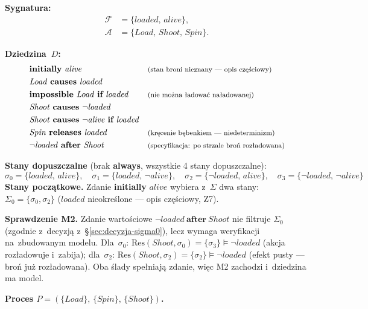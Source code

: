\documentclass[11pt,a4paper]{article}
\newcommand{\causes}{\textbf{causes}}
\newcommand{\aft}{\textbf{after}}
\renewcommand{\iff}{\textbf{if}}
\newcommand{\initially}{\textbf{initially}}
\newcommand{\always}{\textbf{always}}
\newcommand{\impossible}{\textbf{impossible}}
\newcommand{\releases}{\textbf{releases}}
\newcommand{\cmt}[1]{\text{\footnotesize\normalfont (#1)}}
\theoremstyle{definition}
\begin{document}
\medskip
\noindent\textbf{Sygnatura:}
\begin{align*}
  \mathcal{F} &= \{\mathit{loaded},\, \mathit{alive}\}, \\
  \mathcal{A} &= \{\mathit{Load},\, \mathit{Shoot},\, \mathit{Spin}\}.
\end{align*}

\medskip
\noindent\textbf{Dziedzina~$D$:}
{\small
\begin{align*}
  &\initially\ \mathit{alive}
    && \cmt{stan broni nieznany --- opis częściowy} \\
  &\mathit{Load}\ \causes\ \mathit{loaded} \\
  &\impossible\ \mathit{Load}\ \iff\ \mathit{loaded}
    && \cmt{nie można ładować naładowanej} \\
  &\mathit{Shoot}\ \causes\ \neg\mathit{loaded} \\
  &\mathit{Shoot}\ \causes\ \neg\mathit{alive}\ \iff\ \mathit{loaded} \\
  &\mathit{Spin}\ \releases\ \mathit{loaded}
    && \cmt{kręcenie bębenkiem --- niedeterminizm} \\
  &\neg\mathit{loaded}\ \aft\ \mathit{Shoot}
    && \cmt{specyfikacja: po strzale broń rozładowana}
\end{align*}
}

\noindent\textbf{Stany dopuszczalne}
(brak \always{}, wszystkie 4 stany dopuszczalne):
\[
  \sigma_0 = \{\mathit{loaded},\,\mathit{alive}\}, \quad
  \sigma_1 = \{\mathit{loaded},\,\neg\mathit{alive}\}, \quad
  \sigma_2 = \{\neg\mathit{loaded},\,\mathit{alive}\}, \quad
  \sigma_3 = \{\neg\mathit{loaded},\,\neg\mathit{alive}\}
\]
\noindent\textbf{Stany początkowe.} Zdanie \initially{} $\mathit{alive}$
wybiera z~$\Sigma$ dwa stany: $\Sigma_0 = \{\sigma_0, \sigma_2\}$
($\mathit{loaded}$ nieokreślone --- opis częściowy, Z7).

\smallskip
\noindent\textbf{Sprawdzenie M2.} Zdanie wartościowe
$\neg\mathit{loaded}\ \aft\ \mathit{Shoot}$ nie filtruje $\Sigma_0$
(zgodnie z~decyzją z~§\ref{sec:decyzja-sigma0}), lecz wymaga weryfikacji
na~zbudowanym modelu. Dla~$\sigma_0$: $\mathrm{Res}(\mathit{Shoot}, \sigma_0) = \{\sigma_3\}
\models \neg\mathit{loaded}$ (akcja rozładowuje i~zabija); dla~$\sigma_2$:
$\mathrm{Res}(\mathit{Shoot}, \sigma_2) = \{\sigma_2\} \models \neg\mathit{loaded}$
(efekt pusty --- broń już rozładowana). Oba ślady spełniają zdanie,
więc M2 zachodzi i~dziedzina ma model.

\medskip
\noindent\textbf{Proces $P = (\{\mathit{Load}\},\, \{\mathit{Spin}\},\, \{\mathit{Shoot}\})$.}
\end{document}
